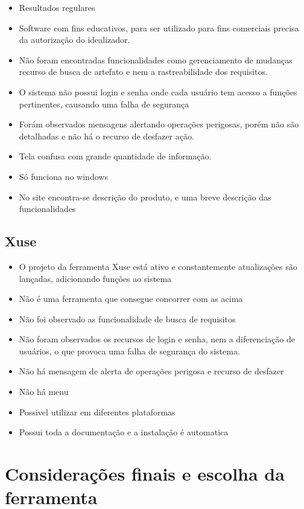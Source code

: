   \begin{itemize}
    \item Resultados regulares
    \item Software com fins educativos, para ser utilizado para fins comerciais precisa da autorização do idealizador.
    \item Não foram encontradas funcionalidades como gerenciamento de mudanças recurso de busca de artefato e nem a rastreabilidade
      dos requisitos.
    \item O sistema não possui login e senha onde cada usuário tem acesso a funções pertinentes, causando uma falha de segurança
    \item Forám observados mensagens alertando operações perigosas, porém não são detalhadas e não há o recurso de desfazer ação.
    \item Tela confusa com grande quantidade de informação.
    \item Só funciona no windows
    \item No site encontra-se descrição do produto, e uma breve descrição das funcionalidades
  \end{itemize}

\subsection{Xuse}

  \begin{itemize}
    \item O projeto da ferramenta Xuse está ativo e constantemente atualizações são lançadas, adicionando funções ao sistema
    \item Não é uma ferramenta que consegue concorrer com as acima
    \item Não foi observado as funcionalidade de busca de requisitos
    \item Não foram observados os recursos de login e senha, nem a diferenciação de usuários, o que provoca uma falha de segurança
      do sistema.
    \item Não há mensagem de alerta de operações perigosa e recurso de desfazer
    \item Não há menu
    \item Possivel utilizar em diferentes plataformas
    \item Possui toda a documentação e a instalação é automatica
  \end{itemize}

\section{Considerações finais e escolha da ferramenta}

